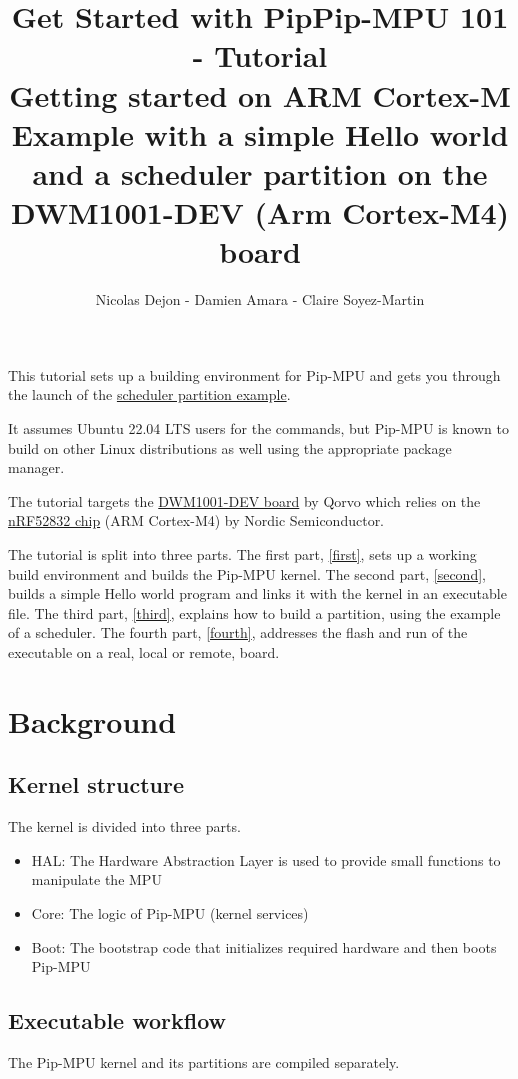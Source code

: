 \documentclass[10pt,a4paper,titlepage]{refart}
\title{Get Started with Pip}
\author{Nicolas Dejon - Damien Amara - Claire Soyez-Martin}
\title{Pip-MPU 101 -  Tutorial \\ Getting started on ARM Cortex-M \\ Example with a simple Hello world and a scheduler partition on the DWM1001-DEV (Arm Cortex-M4) board\\}
\begin{document}
\maketitle
\tableofcontents
\pagebreak

This tutorial sets up a building environment for Pip-MPU and gets you through the launch of the \href{(https://gitlab.univ-lille.fr/2xs/pip/pip-mpu-scheduler)}{scheduler partition example}.

It assumes Ubuntu 22.04 LTS users for the commands, but Pip-MPU is known to build on other Linux distributions as well using the appropriate package manager.

The tutorial targets the \href{https://www.qorvo.com/products/d/da007952}{DWM1001-DEV board} by Qorvo which relies on the \href{https://www.nordicsemi.com/products/nrf52832}{nRF52832 chip} (ARM Cortex-M4) by Nordic Semiconductor.

The tutorial is split into three parts.
The first part, \cref{first}, sets up a working build environment and builds the Pip-MPU kernel.
The second part, \cref{second}, builds a simple Hello world program and links it with the kernel in an executable file.
The third part, \cref{third}, explains how to build a partition, using the example of a scheduler.
The fourth part, \cref{fourth}, addresses the flash and run of the executable on a real, local or remote, board.

\section{Background}

\subsection{Kernel structure}

The kernel is divided into three parts.

\begin{itemize}
    \item HAL: The Hardware Abstraction Layer is used to provide small functions to manipulate the MPU
    \item Core: The logic of Pip-MPU (kernel services)
    \item Boot: The bootstrap code that initializes required hardware and then boots Pip-MPU
\end{itemize}

\subsection{Executable workflow}
The Pip-MPU kernel and its partitions are compiled separately.
\end{document}
